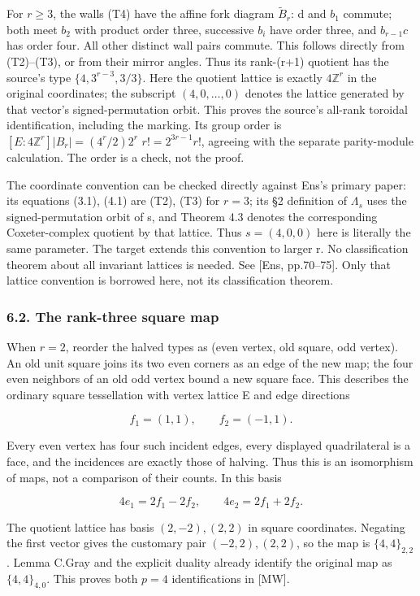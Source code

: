 \documentclass[
  11pt,
  a4paper,
]{article}
\begin{document}
For \(r\ge 3\), the walls (T4) have the affine fork diagram
\(\widetilde B_r\): d and \(b_1\) commute; both meet \(b_2\) with
product order three, successive \(b_i\) have order three, and
\(b_{r-1}c\) has order four. All other distinct wall pairs commute. This
follows directly from (T2)--(T3), or from their mirror angles. Thus its
rank-(r+1) quotient has the source's type \(\{4,3^{r-3},3/3\}\). Here
the quotient lattice is exactly \(4\mathbb Z^r\) in the original
coordinates; the subscript \((4,0,\ldots ,0)\) denotes the lattice
generated by that vector's signed-permutation orbit. This proves the
source's all-rank toroidal identification, including the marking. Its
group order is \([E:4\mathbb Z^r]|B_r|=(4^r/2)2^r\) \(r!=2^{3r-1}r!\),
agreeing with the separate parity-module calculation. The order is a
check, not the proof.

The coordinate convention can be checked directly against Ens's primary
paper: its equations (3.1), (4.1) are (T2), (T3) for \(r=3\); its §2
definition of \(\Lambda _s\) uses the signed-permutation orbit of s, and
Theorem 4.3 denotes the corresponding Coxeter-complex quotient by that
lattice. Thus \(s=(4,0,0)\) here is literally the same parameter. The
target extends this convention to larger r. No classification theorem
about all invariant lattices is needed. See {[}Ens, pp.70--75{]}. Only
that lattice convention is borrowed here, not its classification
theorem.

\subsubsection{6.2. The rank-three square
map}\label{the-rank-three-square-map}

When \(r=2\), reorder the halved types as (even vertex, old square, odd
vertex). An old unit square joins its two even corners as an edge of the
new map; the four even neighbors of an old odd vertex bound a new square
face. This describes the ordinary square tessellation with vertex
lattice E and edge directions

\[
f_1=(1,1),\qquad f_2=(-1,1).
\tag{T5}
\]

Every even vertex has four such incident edges, every displayed
quadrilateral is a face, and the incidences are exactly those of
halving. Thus this is an isomorphism of maps, not a comparison of their
counts. In this basis

\[
4e_1=2f_1-2f_2,\qquad4e_2=2f_1+2f_2.
\]

The quotient lattice has basis \((2,-2),(2,2)\) in square coordinates.
Negating the first vector gives the customary pair \((-2,2),(2,2)\), so
the map is \(\{4,4\}_{2,2}\). Lemma C.Gray and the explicit duality
already identify the original map as \(\{4,4\}_{4,0}\). This proves both
\(p=4\) identifications in {[}MW{]}.
\end{document}
